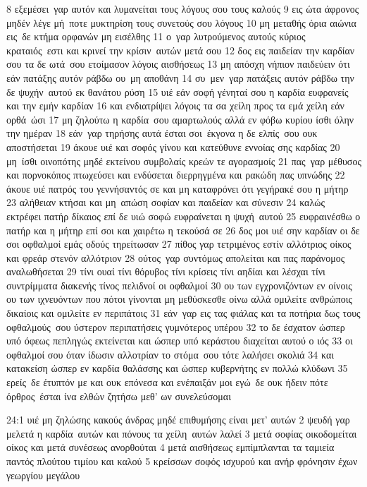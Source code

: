 \documentclass[10pt,oneside,footinclude=true,headinclude=true]{scrbook} %
\begin{document}
8 εξεμέσει γαρ αυτόν και λυμανείται τους λόγους σου τους καλούς
9 εις ώτα άφρονος μηδέν λέγε μή ποτε μυκτηρίση τους συνετούς σου λόγους
10 μη μεταθής όρια αιώνια εις δε κτήμα ορφανών μη εισέλθης
11 ο γαρ λυτρούμενος αυτούς κύριος κραταιός εστι και κρινεί την κρίσιν αυτών μετά σου
12 δος εις παιδείαν την καρδίαν σου τα δε ωτά σου ετοίμασον λόγοις αισθήσεως
13 μη απόσχη νήπιον παιδεύειν ότι εάν πατάξης αυτόν ράβδω ου μη αποθάνη
14 συ μεν γαρ πατάξεις αυτόν ράβδω την δε ψυχήν αυτού εκ θανάτου ρύση
15 υιέ εάν σοφή γένηταί σου η καρδία ευφρανείς και την εμήν καρδίαν
16 και ενδιατρίψει λόγοις τα σα χείλη προς τα εμά χείλη εάν ορθά ώσι
17 μη ζηλούτω η καρδία σου αμαρτωλούς αλλά εν φόβω κυρίου ίσθι όλην την ημέραν
18 εάν γαρ τηρήσης αυτά έσται σοι έκγονα η δε ελπίς σου ουκ αποστήσεται
19 άκουε υιέ και σοφός γίνου και κατεύθυνε εννοίας σης καρδίας
20 μη ίσθι οινοπότης μηδέ εκτείνου συμβολαίς κρεών τε αγορασμοίς
21 πας γαρ μέθυσος και πορνοκόπος πτωχεύσει και ενδύσεται διερρηγμένα και ρακώδη πας υπνώδης
22 άκουε υιέ πατρός του γεννήσαντός σε και μη καταφρόνει ότι γεγήρακέ σου η μήτηρ
23 αλήθειαν κτήσαι και μη απώση σοφίαν και παιδείαν και σύνεσιν
24 καλώς εκτρέφει πατήρ δίκαιος επί δε υιώ σοφώ ευφραίνεται η ψυχή αυτού
25 ευφραινέσθω ο πατήρ και η μήτηρ επί σοι και χαιρέτω η τεκούσά σε
26 δος μοι υιέ σην καρδίαν οι δε σοι οφθαλμοί εμάς οδούς τηρείτωσαν
27 πίθος γαρ τετριμένος εστίν αλλότριος οίκος και φρεάρ στενόν αλλότριον
28 ούτος γαρ συντόμως απολείται και πας παράνομος αναλωθήσεται
29 τίνι ουαί τίνι θόρυβος τίνι κρίσεις τίνι αηδίαι και λέσχαι τίνι συντρίμματα διακενής τίνος πελιδνοί οι οφθαλμοί
30 ου των εγχρονιζόντων εν οίνοις ου των ιχνευόντων που πότοι γίνονται μη μεθύσκεσθε οίνω αλλά ομιλείτε ανθρώποις δικαίοις και ομιλείτε εν περιπάτοις
31 εάν γαρ εις τας φιάλας και τα ποτήρια δως τους οφθαλμούς σου ύστερον περιπατήσεις γυμνότερος υπέρου
32 το δε έσχατον ώσπερ υπό όφεως πεπληγώς εκτείνεται και ώσπερ υπό κεράστου διαχείται αυτού ο ιός
33 οι οφθαλμοί σου όταν ίδωσιν αλλοτρίαν το στόμα σου τότε λαλήσει σκολιά
34 και κατακείση ώσπερ εν καρδία θαλάσσης και ώσπερ κυβερνήτης εν πολλώ κλύδωνι
35 ερείς δε έτυπτόν με και ουκ επόνεσα και ενέπαιξάν μοι εγώ δε ουκ ήδειν πότε όρθρος έσται ίνα ελθών ζητήσω μεθ' ων συνελεύσομαι
\par
24:1 υιέ μη ζηλώσης κακούς άνδρας μηδέ επιθυμήσης είναι μετ' αυτών
2 ψευδή γαρ μελετά η καρδία αυτών και πόνους τα χείλη αυτών λαλεί
3 μετά σοφίας οικοδομείται οίκος και μετά συνέσεως ανορθούται
4 μετά αισθήσεως εμπίμπλανται τα ταμιεία παντός πλούτου τιμίου και καλού
5 κρείσσων σοφός ισχυρού και ανήρ φρόνησιν έχων γεωργίου μεγάλου
\end{document}
